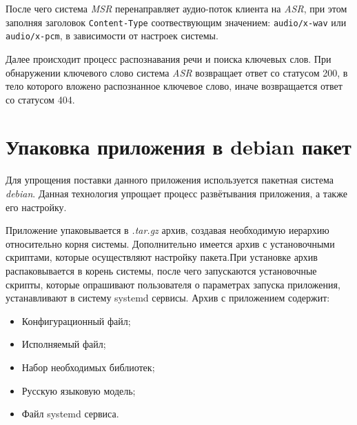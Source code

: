 После чего система \textit{MSR} перенаправляет аудио-поток клиента на \textit{ASR},
при этом заполняя заголовок \texttt{Content-Type} соотвествующим \linebreak
значением: \texttt{audio/x-wav} или \texttt{audio/x-pcm}, в зависимости от
настроек \linebreak системы.

Далее происходит процесс распознавания речи и поиска ключевых слов. При обнаружении
ключевого слово система \textit{ASR} возвращает ответ со статусом 200, в тело которого
вложено распознанное ключевое слово, иначе возвращается ответ со статусом 404.

\section{Упаковка приложения в debian пакет}

Для упрощения поставки данного приложения используется пакетная система \textit{debian}.
Данная технология упрощает процесс развётывания приложения, а также его настройку.

Приложение упаковывается в \textit{.tar.gz} архив, создавая необходимую иерархию
относительно корня системы. Дополнительно имеется архив с установочными скриптами,
которые осуществляют настройку пакета.При установке архив распаковывается
в корень системы, после чего запускаются установочные скрипты, которые
опрашивают пользователя о параметрах запуска приложения, устанавливают в систему
systemd сервисы. Архив с приложением содержит:
\begin{itemize}
    \item Конфигурационный файл;
    \item Исполняемый файл;
    \item Набор необходимых библиотек;
    \item Русскую языковую модель;
    \item Файл systemd сервиса.
\end{itemize}
